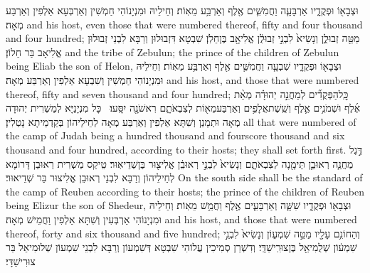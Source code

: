 {וּצְבָא֖וֹ וּפְקֻדָ֑יו אַרְבָּעָ֧ה וַחֲמִשִּׁ֛ים אֶ֖לֶף וְאַרְבַּ֥ע מֵאֽוֹת׃}
{וְחֵילֵיהּ וּמִנְיָנוֹהִי חַמְשִׁין וְאַרְבְּעָא אַלְפִין וְאַרְבַּע מְאָה׃}
{and his host, even those that were numbered thereof, fifty and four thousand and four hundred;}{}
{מַטֵּ֖ה זְבוּלֻ֑ן וְנָשִׂיא֙ לִבְנֵ֣י זְבוּלֻ֔ן אֱלִיאָ֖ב בֶּן\maqqaf חֵלֹֽן׃}
{שִׁבְטָא דִּזְבוּלוּן וְרַבָּא לִבְנֵי זְבוּלוּן אֱלִיאָב בַּר חֵלוֹן׃}
{and the tribe of Zebulun; the prince of the children of Zebulun being Eliab the son of Helon,}{}
{וּצְבָא֖וֹ וּפְקֻדָ֑יו שִׁבְעָ֧ה וַחֲמִשִּׁ֛ים אֶ֖לֶף וְאַרְבַּ֥ע מֵאֽוֹת׃}
{וְחֵילֵיהּ וּמִנְיָנוֹהִי חַמְשִׁין וְשִׁבְעָא אַלְפִין וְאַרְבַּע מְאָה׃}
{and his host, and those that were numbered thereof, fifty and seven thousand and four hundred;}{}
{כׇּֽל\maqqaf הַפְּקֻדִ֞ים לְמַחֲנֵ֣ה יְהוּדָ֗ה מְאַ֨ת אֶ֜לֶף וּשְׁמֹנִ֥ים אֶ֛לֶף וְשֵֽׁשֶׁת\maqqaf אֲלָפִ֥ים וְאַרְבַּע\maqqaf מֵא֖וֹת לְצִבְאֹתָ֑ם רִאשֹׁנָ֖ה יִסָּֽעוּ׃ \setuma }
{כָּל מִנְיָנַיָּא לְמַשְׁרִית יְהוּדָה מְאָה וּתְמָנַן וְשִׁתָּא אַלְפִין וְאַרְבַּע מְאָה לְחֵילֵיהוֹן בְּקַדְמֵיתָא נָטְלִין׃}
{all that were numbered of the camp of Judah being a hundred thousand and fourscore thousand and six thousand and four hundred, according to their hosts; they shall set forth first.}{}
{דֶּ֣גֶל מַחֲנֵ֧ה רְאוּבֵ֛ן תֵּימָ֖נָה לְצִבְאֹתָ֑ם וְנָשִׂיא֙ לִבְנֵ֣י רְאוּבֵ֔ן אֱלִיצ֖וּר בֶּן\maqqaf שְׁדֵיאֽוּר׃}
{טֵיקַס מַשְׁרִית רְאוּבֵן דָּרוֹמָא לְחֵילֵיהוֹן וְרַבָּא לִבְנֵי רְאוּבֵן אֱלִיצוּר בַּר שְׁדֵיאוּר׃}
{On the south side shall be the standard of the camp of Reuben according to their hosts; the prince of the children of Reuben being Elizur the son of Shedeur,}{}
{וּצְבָא֖וֹ וּפְקֻדָ֑יו שִׁשָּׁ֧ה וְאַרְבָּעִ֛ים אֶ֖לֶף וַחֲמֵ֥שׁ מֵאֽוֹת׃}
{וְחֵילֵיהּ וּמִנְיָנוֹהִי אַרְבְּעִין וְשִׁתָּא אַלְפִין וַחֲמֵישׁ מְאָה׃}
{and his host, and those that were numbered thereof, forty and six thousand and five hundred;}{}
{וְהַחוֹנִ֥ם עָלָ֖יו מַטֵּ֣ה שִׁמְע֑וֹן וְנָשִׂיא֙ לִבְנֵ֣י שִׁמְע֔וֹן שְׁלֻמִיאֵ֖ל בֶּן\maqqaf צוּרִֽישַׁדָּֽי׃}
{וְדִשְׁרַן סְמִיכִין עֲלוֹהִי שִׁבְטָא דְּשִׁמְעוֹן וְרַבָּא לִבְנֵי שִׁמְעוֹן שְׁלוּמִיאֵל בַּר צוּרִישַׁדָּי׃}
